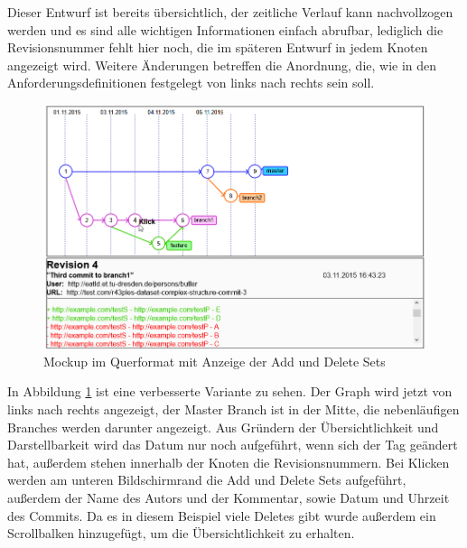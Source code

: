 \documentclass[nocolor]{tudbook}
\begin{document}
Dieser Entwurf ist bereits übersichtlich, der zeitliche Verlauf kann nachvollzogen werden und es sind alle wichtigen Informationen einfach abrufbar, lediglich die Revisionsnummer fehlt hier noch, die im späteren Entwurf in jedem Knoten angezeigt wird. Weitere Änderungen betreffen die Anordnung, die, wie in den Anforderungsdefinitionen festgelegt von links nach rechts sein soll.
\begin{figure}
	\includegraphics[width=\textwidth]{Mockup_Querformat.png}
	\caption{Mockup im Querformat mit Anzeige der Add und Delete Sets}
	\label{fig:mockup2}
\end{figure}

In Abbildung \ref{fig:mockup2} ist eine verbesserte Variante zu sehen. Der Graph wird jetzt von links nach rechts angezeigt, der Master Branch ist in der Mitte, die nebenläufigen Branches werden darunter angezeigt. Aus Gründern der Übersichtlichkeit und Darstellbarkeit wird das Datum nur noch aufgeführt, wenn sich der Tag geändert hat, außerdem stehen innerhalb der Knoten die Revisionsnummern. Bei Klicken werden am unteren Bildschirmrand die Add und Delete Sets aufgeführt, außerdem der Name des Autors und der Kommentar, sowie Datum und Uhrzeit des Commits. Da es in diesem Beispiel viele Deletes gibt wurde außerdem ein Scrollbalken hinzugefügt, um die Übersichtlichkeit zu erhalten.
\end{document}
